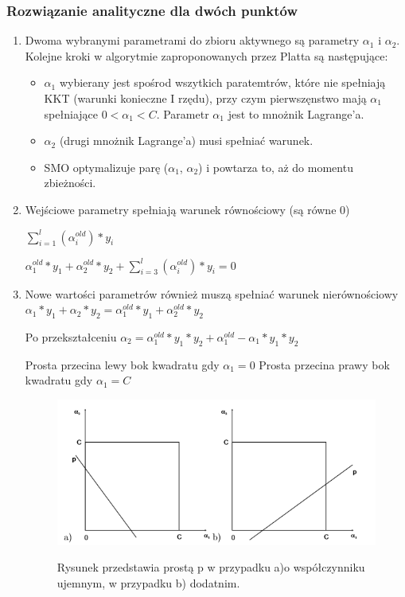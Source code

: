\documentclass[[10pt,a4paper]{article}
\begin{document}
\subsubsection{Rozwiązanie analityczne dla dwóch punktów}
\begin{enumerate}
\item Dwoma wybranymi parametrami do zbioru aktywnego są parametry $\alpha_1$ i $ \alpha_2$. Kolejne kroki w algorytmie zaproponowanych przez Platta są następujące:
\begin{itemize}
\item $\alpha_1$ wybierany jest spośrod wszytkich paratemtrów, które nie spełniają KKT (warunki konieczne I rzędu), przy czym pierwszęnstwo mają $\alpha_1$ spełniające $ 0 < \alpha_{1} < C $. Parametr $\alpha_1$ jest to mnożnik Lagrange'a. 
\item $\alpha_2$ (drugi mnożnik Lagrange'a) musi spełniać warunek. 
\item SMO optymalizuje parę ($\alpha_1$, $\alpha_2$) i powtarza to, aż do momentu zbieżności. 
\end{itemize}
\item Wejściowe parametry spełniają warunek równościowy (są równe 0)


$ \sum_{i=1}^{l}(\alpha_{i}^{old})*y_{i}$
 
$\alpha_{1}^{old}*y_{1} + \alpha_{2}^{old}*y_{2} + \sum_{i=3}^{l}(\alpha_{i}^{old})*y_{i} = 0 $

\item Nowe wartości parametrów również muszą spełniać warunek nierównościowy
$\alpha_{1}*y_{1} + \alpha_{2}*y_{2} = \alpha_{1}^{old}*y_{1} + \alpha_{2}^{old}*y_{2} $

Po przekształceniu
$\alpha_{2} = \alpha_{1}^{old}*y_{1}*y_{2} + \alpha_{1}^{old} - \alpha_{1}*y_{1}*y_{2} $

Prosta przecina lewy bok kwadratu gdy $\alpha_{1} = 0 $
\newline Prosta przecina prawy bok kwadratu gdy $\alpha_{1} = C $

\begin{figure}[h]
\centering
\includegraphics{1.png}\\
\caption{Rysunek przedstawia prostą p w przypadku a)o współczynniku ujemnym, w przypadku b) dodatnim.}
\end{figure}


\end{enumerate}
\end{document}
